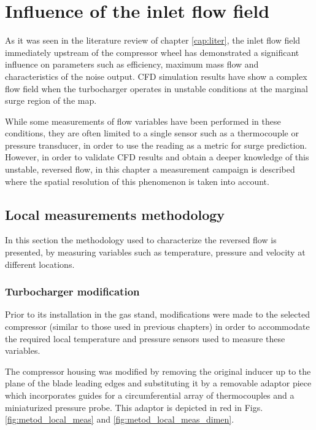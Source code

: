 \chapter{Influence of the inlet flow field}
\label{cap:inlet}

\noindent As it was seen in the literature review of chapter \ref{cap:liter}, the inlet flow field immediately upstream of the compressor wheel has demonstrated a significant influence on parameters such as efficiency, maximum mass flow and characteristics of the noise output. CFD simulation results have show a complex flow field when the turbocharger operates in unstable conditions at the marginal surge region of the map.

While some measurements of flow variables have been performed in these conditions, they are often limited to a single sensor such as a thermocouple or pressure transducer, in order to use the reading as a metric for surge prediction. However, in order to validate CFD results and obtain a deeper knowledge of this unstable, reversed flow, in this chapter a measurement campaign is described where the spatial resolution of this phenomenon is taken into account.

\section{Local measurements methodology}

In this section the methodology used to characterize the reversed flow is presented, by measuring variables such as temperature, pressure and velocity at different locations.

\subsection{Turbocharger modification}
\label{sub:inlet_setup}

Prior to its installation in the gas stand, modifications were made to the selected compressor (similar to those used in previous chapters) in order to accommodate the required local temperature and pressure sensors used to measure these variables.

The compressor housing was modified by removing the original inducer up to the plane of the blade leading edges and substituting it by a removable adaptor piece which incorporates guides for a circumferential array of thermocouples and a miniaturized pressure probe. This adaptor is depicted in red in Figs. \ref{fig:metod_local_meas} and \ref{fig:metod_local_meas_dimen}.

